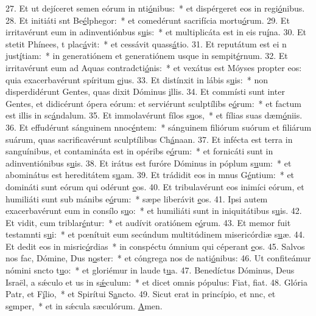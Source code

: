 27. Et ut dejíceret semen eórum in nti\uline{ó}nibus:~* et dispérgeret eos in regi\uline{ó}nibus.
28. Et initiáti snt Be\uline{é}lphegor:~* et comedérunt sacrifícia mortu\uline{ó}rum.
29. Et irritavérunt eum in adinventiónbus s\uline{u}is:~* et multiplicáta est in eis ru\uline{í}na.
30. Et stetit Phínees, t plac\uline{á}vit:~* et cessávit quass\uline{á}tio.
31. Et reputátum est ei n just\uline{í}tiam:~* in generatiónem et generatiónem usque in sempit\uline{é}rnum.
32. Et irritavérunt eum ad Aquas contradcti\uline{ó}nis:~* et vexátus est Móyses propter eos: quia exacerbavérunt spíritum \uline{e}jus.
33. Et distínxit in lábis s\uline{u}is:~* non disperdidérunt Gentes, quas dixit Dóminus \uline{i}llis.
34. Et commísti sunt inter Gentes, et didicérunt ópera eórum: et serviérunt sculptílibs e\uline{ó}rum:~* et factum est illis in sc\uline{á}ndalum.
35. Et immolavérunt fílos s\uline{u}os,~* et fílias suas dæm\uline{ó}niis.
36. Et effudérunt sánguinem nnoc\uline{é}ntem:~* sánguinem filiórum suórum et filiárum suárum, quas sacrificavérunt sculptílibus Ch\uline{á}naan.
37. Et infécta est terra in sanguínibus, et contamináta est in opéribs e\uline{ó}rum:~* et fornicáti sunt in adinventiónibus s\uline{u}is.
38. Et irátus est furóre Dóminus in póplum s\uline{u}um:~* et abominátus est hereditátem s\uline{u}am.
39. Et trádidit eos in mnus G\uline{é}ntium:~* et domináti sunt eórum qui odérunt \uline{e}os.
40. Et tribulavérunt eos inimíci eórum, et humiliáti sunt sub mánibs e\uline{ó}rum:~* sæpe liberávit \uline{e}os.
41. Ipsi autem exacerbavérunt eum in consílo s\uline{u}o:~* et humiliáti sunt in iniquitátibus s\uline{u}is.
42. Et vidit, cum triblar\uline{é}ntur:~* et audívit oratiónem e\uline{ó}rum.
43. Et memor fuit testamnti s\uline{u}i:~* et pœnítuit eum secúndum multitúdinem misericórdiæ s\uline{u}æ.
44. Et dedit eos in misric\uline{ó}rdias~* in conspéctu ómnium qui céperant \uline{e}os.
45. Salvos nos fac, Dómine, Dus n\uline{o}ster:~* et cóngrega nos de nati\uline{ó}nibus:
46. Ut confiteámur nómini sncto t\uline{u}o:~* et gloriémur in laude t\uline{u}a.
47. Benedíctus Dóminus, Deus Israël, a sǽculo et us in s\uline{ǽ}culum:~* et dicet omnis pópulus: Fiat, f\uline{i}at.
48. Glória Patr, et F\uline{í}lio,~* et Spirítui S\uline{a}ncto.
49. Sicut erat in princípio, et nnc, et s\uline{e}mper,~* et in sǽcula sæculórum. \uline{A}men.
